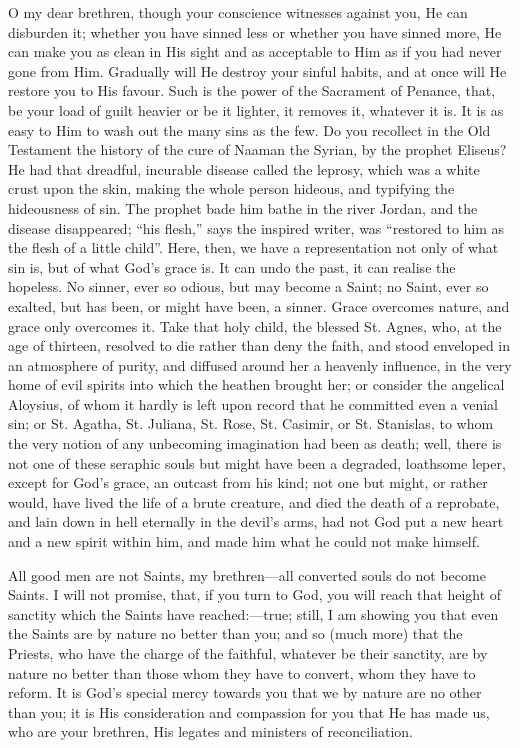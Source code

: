O my dear brethren, though your conscience witnesses against you,
He can disburden it; whether you have sinned less or whether you have
sinned more, He can make you as clean in His sight and as acceptable
to Him as if you had never gone from Him. Gradually will He destroy
your sinful habits, and at once will He restore you to His favour.
Such is the power of the Sacrament of Penance, that, be your load of
guilt heavier or be it lighter, it removes it, whatever it is. It is
as easy to Him to wash out the many sins as the few. Do you recollect
in the Old Testament the history of the cure of Naaman the Syrian, by
the prophet Eliseus? He had that dreadful, incurable disease called
the leprosy, which was a white crust upon the skin, making the whole
person hideous, and typifying the hideousness of sin. The prophet bade
him bathe in the river Jordan, and the disease disappeared; ``his
flesh,'' says the inspired writer, was ``restored to him as
the flesh of a little child''. Here, then, we have a
representation not only of what sin is, but of what God's grace is. It
can undo the past, it can realise the hopeless. No sinner, ever so
odious, but may become a Saint; no Saint, ever so exalted, but has
been, or might have been, a sinner. Grace overcomes nature, and grace
only overcomes it. Take that holy child, the blessed St. Agnes, who,
at the age of thirteen, resolved to die rather than deny the faith,
and stood enveloped in an atmosphere of purity, and diffused around
her a heavenly influence, in the very home of evil spirits into which
the heathen brought her; or consider the angelical Aloysius, of whom
it hardly is left upon record that he committed even a venial sin; or
St. Agatha, St. Juliana, St. Rose, St. Casimir, or St. Stanislas, to
whom the very notion of any unbecoming imagination had been as death;
well, there is not one of these seraphic souls but might have been a
degraded, loathsome leper, except for God's grace, an outcast from his
kind; not one but might, or rather would, have lived the life of a
brute creature, and died the death of a reprobate, and lain down in
hell eternally in the devil's arms, had not God put a new heart and a
new spirit within him, and made him what he could not make himself.

All good men are not Saints, my brethren—all converted souls do
not become Saints. I will not promise, that, if you turn to God, you
will reach that height of sanctity which the Saints have reached:—true;
still, I am showing you that even the Saints are by nature no better
than you; and so (much more) that the Priests, who have the charge of
the faithful, whatever be their sanctity, are by nature no better than
those whom they have to convert, whom they have to reform. It is God's
special mercy towards you that we by nature are no other than you; it
is His consideration and compassion for you that He has made us, who
are your brethren, His legates and ministers of reconciliation.

